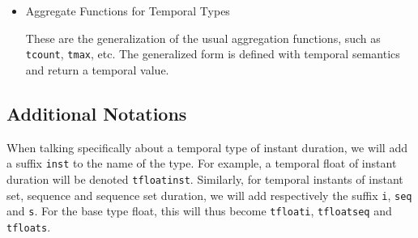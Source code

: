 \begin{itemize}
    \item Aggregate Functions for Temporal Types

        These are the generalization of the usual aggregation functions, such as \lstinline{tcount}, \lstinline{tmax}, etc. The generalized form is defined with temporal semantics and return a temporal value.

\end{itemize}

\subsection{Additional Notations}
\label{section:mobilitydb_notations}

When talking specifically about a temporal type of instant duration, we will add a suffix \lstinline{inst} to the name of the type. For example, a temporal float of instant duration will be denoted \lstinline{tfloatinst}. 
Similarly, for temporal instants of instant set, sequence and sequence set duration, we will add respectively the suffix \lstinline{i}, \lstinline{seq} and \lstinline{s}. For the base type float, this will thus become \lstinline{tfloati}, \lstinline{tfloatseq} and \lstinline{tfloats}.